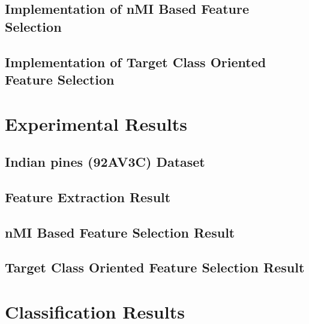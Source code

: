 \documentclass[document.tex]{subfiles}
\begin{document}
\subsection{Implementation of nMI Based Feature Selection}

\subsection{Implementation of Target Class Oriented Feature Selection}

\section{Experimental Results}

\subsection{Indian pines (92AV3C) Dataset}
\subsection{Feature Extraction Result}
\subsection{nMI Based Feature Selection Result}
\subsection{Target Class Oriented Feature Selection Result}
\section{Classification Results}
\end{document}
